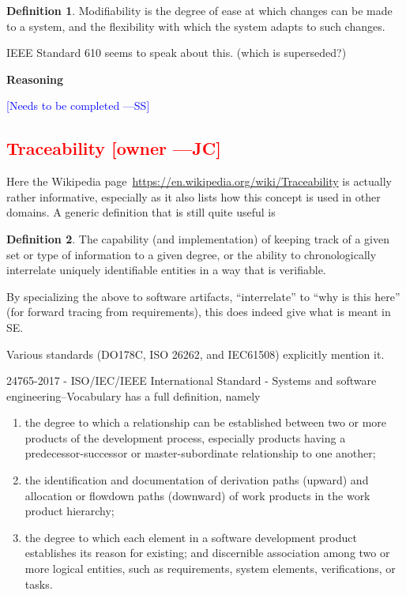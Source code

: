 \documentclass[letterpaper,cleveref]{lipics-v2019}
\newcommand{\authornote}[3]{\textcolor{#1}{[#3 ---#2]}}
\newcommand{\authornote}[3]{}
\newcommand{\wss}[1]{\authornote{blue}{SS}{#1}} %
\newcommand{\jc}[1]{\authornote{red}{JC}{#1}} %
\newcommand{\notdone}[1]{\textcolor{red}{#1}}
\theoremstyle{definition}
\newtheorem{defn}{Definition}
\begin{document}
\begin{defn}
Modifiability is the degree of ease at which changes can be made to a system,
and the flexibility with which the system adapts to such changes.
\end{defn}

IEEE Standard 610 seems to speak about this. (which is superseded?)

\noindent \textbf{Reasoning}

\wss{Needs to be completed}

\subsection{\notdone{Traceability} \jc{owner}}

Here the Wikipedia page~\url{https://en.wikipedia.org/wiki/Traceability} is
actually rather informative, especially as it also lists how this concept is
used in other domains.  A generic definition that is still quite useful is
\begin{defn}
The capability (and implementation) of keeping track of a given set or type of
information to a given degree, or the ability to chronologically interrelate
uniquely identifiable entities in a way that is verifiable.
\end{defn}
By specializing the above to software artifacts, ``interrelate'' to 
``why is this here'' (for forward tracing from requirements), this does
indeed give what is meant in SE.

Various standards (DO178C, ISO 26262, and IEC61508) explicitly mention it.

24765-2017 - ISO/IEC/IEEE International Standard - Systems and software engineering--Vocabulary
has a full definition, namely
\begin{enumerate}
\item the degree to which a relationship can be established between two or more
products of the development process, especially products having a
predecessor-successor or master-subordinate relationship to one another;
\item
the identification and documentation of derivation paths (upward) and
allocation or flowdown paths (downward) of work products in the work product
hierarchy;
\item the degree to which each element in a software development
product establishes its reason for existing; and discernible association
among two or more logical entities, such as requirements, system elements,
verifications, or tasks.
\end{enumerate}
\end{document}
